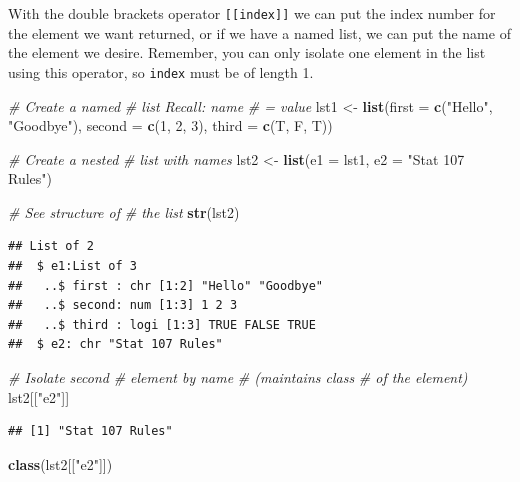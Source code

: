 \documentclass[
]{book}
\newenvironment{Shaded}{\begin{snugshade}}{\end{snugshade}}
\newcommand{\CommentTok}[1]{\textcolor[rgb]{0.56,0.35,0.01}{\textit{#1}}}
\newcommand{\DataTypeTok}[1]{\textcolor[rgb]{0.13,0.29,0.53}{#1}}
\newcommand{\DecValTok}[1]{\textcolor[rgb]{0.00,0.00,0.81}{#1}}
\newcommand{\KeywordTok}[1]{\textcolor[rgb]{0.13,0.29,0.53}{\textbf{#1}}}
\newcommand{\NormalTok}[1]{#1}
\newcommand{\StringTok}[1]{\textcolor[rgb]{0.31,0.60,0.02}{#1}}
\begin{document}
With the double brackets operator \texttt{{[}{[}index{]}{]}} we can put the index number for the element we want returned, or if we have a named list, we can put the name of the element we desire. Remember, you can only isolate one element in the list using this operator, so \texttt{index} must be of length 1.

\begin{Shaded}
\begin{Highlighting}[]
\CommentTok{# Create a named}
\CommentTok{# list Recall: name}
\CommentTok{# = value}
\NormalTok{lst1 <-}\StringTok{ }\KeywordTok{list}\NormalTok{(}\DataTypeTok{first =} \KeywordTok{c}\NormalTok{(}\StringTok{"Hello"}\NormalTok{,}
    \StringTok{"Goodbye"}\NormalTok{), }\DataTypeTok{second =} \KeywordTok{c}\NormalTok{(}\DecValTok{1}\NormalTok{,}
    \DecValTok{2}\NormalTok{, }\DecValTok{3}\NormalTok{), }\DataTypeTok{third =} \KeywordTok{c}\NormalTok{(T,}
\NormalTok{    F, T))}

\CommentTok{# Create a nested}
\CommentTok{# list with names}
\NormalTok{lst2 <-}\StringTok{ }\KeywordTok{list}\NormalTok{(}\DataTypeTok{e1 =}\NormalTok{ lst1,}
    \DataTypeTok{e2 =} \StringTok{"Stat 107 Rules"}\NormalTok{)}

\CommentTok{# See structure of}
\CommentTok{# the list}
\KeywordTok{str}\NormalTok{(lst2)}
\end{Highlighting}
\end{Shaded}

\begin{verbatim}
## List of 2
##  $ e1:List of 3
##   ..$ first : chr [1:2] "Hello" "Goodbye"
##   ..$ second: num [1:3] 1 2 3
##   ..$ third : logi [1:3] TRUE FALSE TRUE
##  $ e2: chr "Stat 107 Rules"
\end{verbatim}

\begin{Shaded}
\begin{Highlighting}[]
\CommentTok{# Isolate second}
\CommentTok{# element by name}
\CommentTok{# (maintains class}
\CommentTok{# of the element)}
\NormalTok{lst2[[}\StringTok{"e2"}\NormalTok{]]}
\end{Highlighting}
\end{Shaded}

\begin{verbatim}
## [1] "Stat 107 Rules"
\end{verbatim}

\begin{Shaded}
\begin{Highlighting}[]
\KeywordTok{class}\NormalTok{(lst2[[}\StringTok{"e2"}\NormalTok{]])}
\end{Highlighting}
\end{Shaded}
\end{document}
